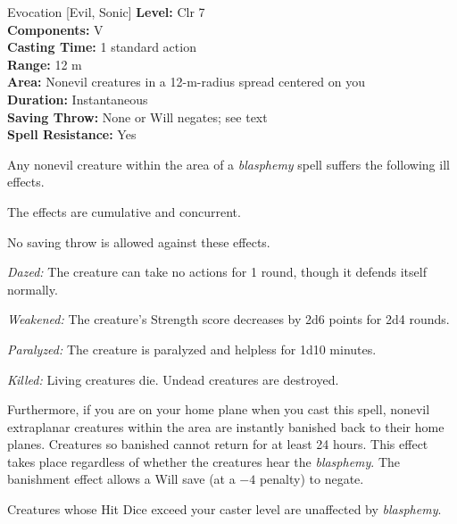 {Evocation [Evil, Sonic]}
{
	\textbf{Level:}
	Clr 7\\
	\textbf{Components:}
	V\\
	\textbf{Casting Time:}
	1 standard action\\
	\textbf{Range:}
	12 m\\
	\textbf{Area:}
	Nonevil creatures in a 12-m-radius spread centered on you\\
	\textbf{Duration:}
	Instantaneous\\
	\textbf{Saving Throw:}
	None or Will negates; see text\\
	\textbf{Spell Resistance:}
	Yes\\
}
{
	Any nonevil creature within the area of a \emph{blasphemy} spell suffers the following ill effects.


	The effects are cumulative and concurrent.

	No saving throw is allowed against these effects.

	\textit{Dazed:}
	The creature can take no actions for 1 round, though it defends itself normally.

	\textit{Weakened:}
	The creature's Strength score decreases by 2d6 points for 2d4 rounds.

	\textit{Paralyzed:}
	The creature is paralyzed and helpless for 1d10 minutes.

	\textit{Killed:}
	Living creatures die. Undead creatures are destroyed.

	Furthermore, if you are on your home plane when you cast this spell, nonevil extraplanar creatures within the area are instantly banished back to their home planes. Creatures so banished cannot return for at least 24 hours. This effect takes place regardless of whether the creatures hear the \emph{blasphemy}. The banishment effect allows a Will save (at a $-4$ penalty) to negate.

	Creatures whose Hit Dice exceed your caster level are unaffected by \emph{blasphemy}.

}
